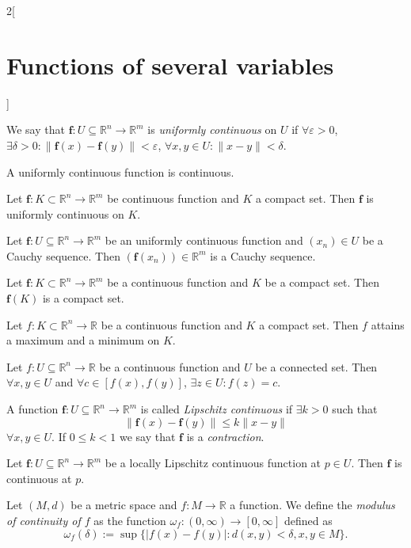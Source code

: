 \documentclass[../../../main.tex]{subfiles}
\begin{document}
\begin{multicols}{2}[\section{Functions of several variables}]
\begin{definition}
We say that $\mathbf{\boldsymbol{f}}:U\subseteq\mathbb{R}^n\rightarrow\mathbb{R}^m$ is \textit{uniformly continuous} on $U$ if $\forall\varepsilon>0$, $\exists\delta>0:\|\mathbf{\boldsymbol{f}}(x)-\mathbf{\boldsymbol{f}}(y)\|<\varepsilon$, $\forall x,y\in U:\|x-y\|<\delta$.
\end{definition}
\begin{corollary}
A uniformly continuous function is continuous.
\end{corollary}
\begin{theorem}
Let $\mathbf{\boldsymbol{f}}:K\subset\mathbb{R}^n\rightarrow\mathbb{R}^m$ be continuous function and $K$ a compact set. Then $\mathbf{\boldsymbol{f}}$ is uniformly continuous on $K$.
\end{theorem}
\begin{theorem}
Let $\mathbf{\boldsymbol{f}}:U\subseteq\mathbb{R}^n\rightarrow\mathbb{R}^m$ be an uniformly continuous function and $(x_n)\in U$ be a Cauchy sequence. Then $(\mathbf{\boldsymbol{f}}(x_n))\in\mathbb{R}^m$ is a Cauchy sequence.
\end{theorem}
\begin{theorem}
Let $\mathbf{\boldsymbol{f}}:K\subset\mathbb{R}^n\rightarrow\mathbb{R}^m$ be a continuous function and $K$ be a compact set. Then $\mathbf{\boldsymbol{f}}(K)$ is a compact set.
\end{theorem}
\begin{theorem}
Let $f:K\subset\mathbb{R}^n\rightarrow\mathbb{R}$ be a continuous function and $K$ a compact set. Then $f$ attains a maximum and a minimum on $K$.
\end{theorem}
\begin{theorem}
Let $f:U\subseteq\mathbb{R}^n\rightarrow\mathbb{R}$ be a continuous function and $U$ be a connected set. Then $\forall x,y\in U$ and $\forall c\in[f(x),f(y)]$, $\exists z\in U:f(z)=c$.
\end{theorem}
\begin{definition}
A function $\mathbf{\boldsymbol{f}}:U\subseteq\mathbb{R}^n\rightarrow\mathbb{R}^m$ is called \textit{Lipschitz continuous} if $\exists k>0$ such that $$\|\mathbf{\boldsymbol{f}}(x)-\mathbf{\boldsymbol{f}}(y)\|\leq k\|x-y\|$$ $\forall x,y\in U$. If $0\leq k<1$ we say that $\mathbf{\boldsymbol{f}}$ is a \textit{contraction}.
\label{FOSV_contr}
\end{definition}
\begin{prop}
Let $\mathbf{\boldsymbol{f}}:U\subseteq\mathbb{R}^n\rightarrow\mathbb{R}^m$ be a locally Lipschitz continuous function at $p\in U$. Then $\mathbf{\boldsymbol{f}}$ is continuous at $p$.
\end{prop}
\begin{definition}
Let $(M,d)$ be a metric space and $f:M\rightarrow\mathbb{R}$ a function. We define the \textit{modulus of continuity of $f$} as the function $\omega_f:(0,\infty)\rightarrow[0,\infty]$ defined as $$\omega_f(\delta):=\sup\{|f(x)-f(y)|:d(x,y)<\delta, x,y\in M\}.$$
\end{definition}

\end{multicols}
\end{document}
